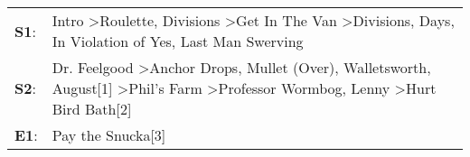 \begin{supertabular}{p{0.03\textwidth}p{0.92\textwidth}}
 \textbf{S1}:  &                                                               Intro\textsuperscript{} \textgreater \enspace Roulette\textsuperscript{}, \enspace Divisions\textsuperscript{} \textgreater \enspace Get In The Van\textsuperscript{} \textgreater \enspace Divisions\textsuperscript{},  Days\textsuperscript{}, \enspace In Violation of Yes\textsuperscript{}, \enspace Last Man Swerving\textsuperscript{}  \enspace  \\
 \textbf{S2}:  &  Dr. Feelgood\textsuperscript{} \textgreater \enspace Anchor Drops\textsuperscript{}, \enspace Mullet (Over)\textsuperscript{}, \enspace Walletsworth\textsuperscript{}, \enspace August[1]\textsuperscript{} \textgreater \enspace Phil's Farm\textsuperscript{} \textgreater \enspace Professor Wormbog\textsuperscript{}, \enspace Lenny\textsuperscript{} \textgreater \enspace Hurt Bird Bath[2]\textsuperscript{}  \enspace  \\
 \textbf{E1}:  &                                                                                                                                                                                                                                                                                                                                                                                     Pay the Snucka[3]\textsuperscript{}  \enspace  \\
\end{supertabular}
